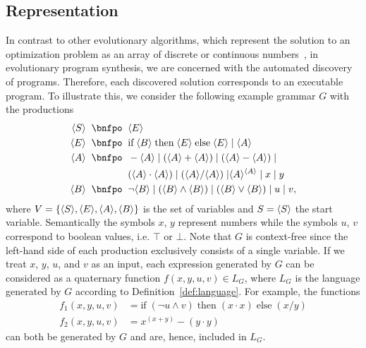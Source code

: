 \subsection{Representation}\label{sec:gggp-representation}
In contrast to other evolutionary algorithms, which represent the solution to an optimization problem as an array of discrete or continuous numbers~\cite{back1997handbook}, in evolutionary program synthesis, we are concerned with the automated discovery of programs. Therefore, each discovered solution corresponds to an executable program.
To illustrate this, we consider the following example grammar $G$ with the productions
\begin{equation}
	\begin{split}
		\ps S \; \; \bnfpo & \; \; \ps E \\
		\ps E \; \; \bnfpo & \; \; \text{if} \; \ps B \; \text{then} \; \ps E \; \text{else} \; \ps E \; | \; \ps A \\
		\ps A \; \; \bnfpo & \; \; -\ps A \; | \; (\ps A + \ps A) \; | \; (\ps A - \ps A) \; | \\
		 & \; \; (\ps A \cdot \ps A) \; | \; (\ps A / \ps A) \; | \ps{A}^{\ps{A}} \; | \; x \; | \; y \\  
		\ps B \; \; \bnfpo & \; \;  \neg \ps B \; | \; (\ps B \wedge \ps B) \; | \; (\ps B \vee \ps B) \; | \; u \; | \; v,
	\end{split}
\label{eq:gp-example-grammar}
\end{equation}
where $V = \{\langle S \rangle, \langle E \rangle, \langle A \rangle, \langle B \rangle\}$ is the set of variables and $S = \langle S \rangle$ the start variable.
Semantically the symbols $x$, $y$ represent numbers while the symbols $u$, $v$ correspond to boolean values, i.e. $\top$ or $\bot$.
Note that $G$ is context-free since the left-hand side of each production exclusively consists of a single variable.
If we treat $x$, $y$, $u$, and $v$ as an input, each expression generated by $G$ can be considered as a quaternary function $f(x,y,u,v) \in L_{G}$, where $L_G$ is the language generated by $G$ according to Definition~\ref{def:language}.
For example, the functions
\begin{equation}
	\begin{split}
		f_1(x,y,u,v) & = \text{if} \; (\neg u \wedge v) \; \text{then} \; (x \cdot x) \; \text{else} \; (x / y) \\
		f_2(x,y,u,v) & = x^{(x + y)} - (y \cdot y)
	\end{split}
\label{eq:gp-example-functions}
\end{equation} can both be generated by $G$ and are, hence, included in $L_G$.
